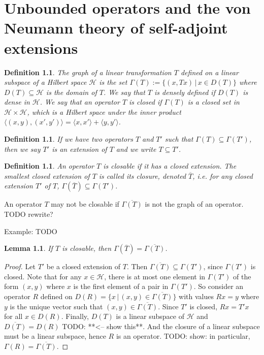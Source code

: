 \documentclass[12pt,oneside]{report}
\newtheorem{lem}[thm]{Lemma}
\newtheorem{defn}[thm]{Definition}
\begin{document}
\chapter{Unbounded operators and the von Neumann theory of self-adjoint extensions}

\begin{defn}
    The graph of a linear transformation $T$ defined on a linear subspace of a Hilbert space $\mathscr{H}$ is the set $\Gamma(T) := \{ (x, Tx) \, | \, x \in D(T) \}$ where $D(T) \subseteq \mathscr{H}$ is the domain of $T$. We say that $T$ is densely defined if $D(T)$ is dense in $\mathscr{H}$. We say that an operator $T$ is closed if $\Gamma(T)$ is a closed set in $\mathscr{H} \times \mathscr{H}$, which is a Hilbert space under the inner product $\langle (x,y), (x',y') \rangle = \langle x,x' \rangle + \langle y,y' \rangle$.
\end{defn}

\begin{defn}
    If we have two operators $T$ and $T'$ such that $\Gamma(T) \subseteq \Gamma(T')$, then we say $T'$ is an extension of $T$ and we write $T \subseteq T'$.
\end{defn}

\begin{defn}
    An operator $T$ is closable if it has a closed extension. The smallest closed extension of $T$ is called its closure, denoted $\overline{T}$, i.e. for any closed extension $T'$ of $T$, $\Gamma(\overline{T}) \subseteq \Gamma(T')$.
\end{defn}

An operator $T$ may not be closable if $\overline{\Gamma(T)}$ is not the graph of an operator. TODO rewrite?

Example: TODO 

\begin{lem}
    If $T$ is closable, then $\Gamma(\overline{T}) = \overline{\Gamma(T)}$.
\end{lem}
\begin{proof}
    Let $T'$ be a closed extension of $T$. Then $\overline{\Gamma(T)} \subseteq \Gamma(T')$, since $\Gamma(T')$ is closed. Note that for any $x \in \mathscr{H}$, there is at most one element in $\Gamma(T')$ of the form $(x, y)$ where $x$ is the first element of a pair in $\Gamma(T')$. So consider an operator $R$ defined on $D(R) = \{ x \, | \, (x,y) \in \overline{\Gamma(T)} \}$ with values $Rx = y$ where $y$ is the unique vector such that $(x,y) \in \overline{\Gamma(T)}$. Since $T'$ is closed, $Rx = T'x$ for all $x \in D(R)$. Finally, $D(T)$ is a linear subspace of $\mathscr{H}$ and $\overline{D(T)} = D(R)$ TODO: **<-- show this**. And the closure of a linear subspace must be a linear subspace, hence $R$ is an operator. TODO: show: in particular, $\Gamma(R) = \overline{\Gamma(T)}$.
\end{proof}
\end{document}
